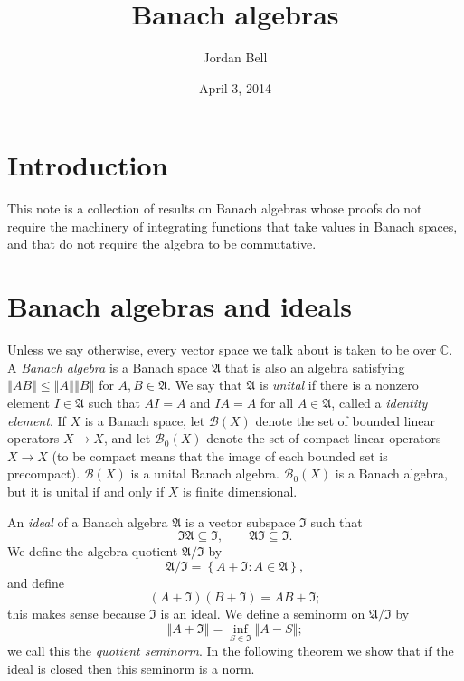 \documentclass{article}
\newcommand{\norm}[1]{\left\Vert #1 \right\Vert}
\theoremstyle{definition}
\begin{document}
\title{Banach algebras}
\author{Jordan Bell}
\date{April 3, 2014}

\maketitle

\section{Introduction}
This note is a collection of results on Banach algebras whose proofs do not require the machinery of integrating functions that take values in Banach spaces, and that
do not require the algebra to be commutative.

\section{Banach algebras and ideals}
Unless we say otherwise, every vector  space we talk about is taken to be over $\mathbb{C}$. A   {\em Banach algebra}  is a  Banach space $\mathfrak{A}$ that is also an algebra satisfying
 $\norm{AB} \leq \norm{A} \norm{B}$ for $A,B \in \mathfrak{A}$. We say that $\mathfrak{A}$ is {\em unital} if there is 
 a nonzero element $I \in \mathfrak{A}$ such that $AI=A$ and $IA=A$ for all $A \in \mathfrak{A}$, called a {\em identity element}. 
If $X$ is a Banach space,
let $\mathscr{B}(X)$ denote the set of bounded linear operators $X \to X$, and let $\mathscr{B}_0(X)$ denote the set of compact linear operators
$X \to  X$ (to be compact means that the image of each bounded set is precompact). $\mathscr{B}(X)$ is a unital Banach algebra. $\mathscr{B}_0(X)$ is a Banach algebra,
but it is unital if and only if $X$ is finite dimensional.
 
An {\em ideal} of a Banach algebra $\mathfrak{A}$ is a vector subspace $\mathfrak{I}$  such that
\[
\mathfrak{I}\mathfrak{A} \subseteq \mathfrak{I}, \qquad \mathfrak{A} \mathfrak{I} \subseteq \mathfrak{I}.
\]
We define the algebra quotient $\mathfrak{A} / \mathfrak{I}$ by 
\[
\mathfrak{A} / \mathfrak{I} = \left\{ A+\mathfrak{I}: A \in \mathfrak{A}\right\},
\]
and define
\[
(A+\mathfrak{I})(B+\mathfrak{I}) = AB+\mathfrak{I};
\]
this makes sense because $\mathfrak{I}$ is an ideal.
We define a seminorm on $\mathfrak{A}/\mathfrak{I}$ by 
\[
\norm{A+\mathfrak{I}} = \inf_{S \in \mathfrak{I}} \norm{A-S};
\]
we call this the {\em quotient seminorm}. In the following theorem we show that if the ideal is closed then this seminorm is a norm.
\end{document}
